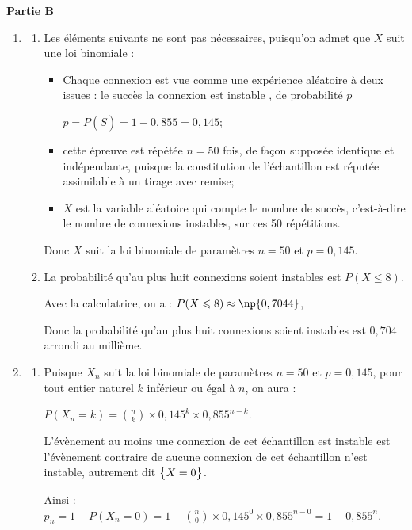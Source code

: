 \textbf{Partie B}

\medskip

\begin{enumerate}
\item 
	\begin{enumerate}
		\item Les éléments suivants ne sont pas nécessaires, puisqu'on admet que $X$ suit une loi binomiale :

\begin{itemize}
\item Chaque connexion est vue comme une expérience aléatoire à deux issues : le succès \og la connexion est instable \fg{}, de probabilité $p$

$p = P\left(\overline{S}\right) = 1-0,855 = 0,145$;
\item cette épreuve est répétée $n = 50$ fois, de façon supposée identique et indépendante, puisque la constitution de l'échantillon est réputée assimilable à un tirage avec remise;
\item $X$ est la variable aléatoire qui compte le nombre de succès, c'est-à-dire le nombre de connexions instables, sur ces 50 répétitions.
\end{itemize}

Donc $X$ suit la loi binomiale de paramètres $n = 50$ et $p = 0,145$.

		\item La probabilité qu'au plus huit connexions soient instables est $P(X \leqslant 8)$.

Avec la calculatrice, on a : $P(X \leqslant 8) \approx \np{0,7044}$, 

Donc la probabilité qu'au plus huit connexions soient instables est  $0,704$ arrondi au millième.
	\end{enumerate}

\item
	\begin{enumerate}
		\item Puisque $X_n$ suit la loi binomiale de paramètres $n=50$ et $p = 0,145$, pour tout entier naturel $k$ inférieur ou égal à $n$, on aura :

$P(X_n = k) = \displaystyle \binom{n}{k} \times 0,145^k \times 0,855^{n-k}$.

L'évènement \og au moins une connexion de cet échantillon est instable\fg{} est l'évènement contraire de \og aucune connexion de cet échantillon n'est instable\fg{}, autrement dit $\left\{X = 0\strut \right\}$.

Ainsi : $p_n = 1 - P(X_n = 0) = 1 - \displaystyle \binom{n}{0} \times 0,145^0 \times 0,855^{n-0} = 1 - 0,855^n$.


\end{enumerate}
\end{enumerate}
